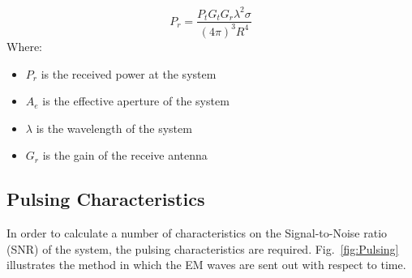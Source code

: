 \documentclass[11pt]{witseiepaper}
\begin{document}
\begin{bibunit}[witseie]
\begin{equation} \label{eqn:ReceivedPower}
    P_{r} = \frac{P_{t} G_{t} G_{r} \lambda^2 \sigma}{(4 \pi )^3 R^4}
\end{equation}
Where:
\begin{itemize}
    \item $P_{r}$ is the received power at the system
    \item $A_{e}$ is the effective aperture of the system
    \item $\lambda$ is the wavelength of the system
    \item $G_{r}$ is the gain of the receive antenna
\end{itemize}

\subsection{Pulsing Characteristics} \label{sec:PulsingCharacteristics}
In order to calculate a number of characteristics on the Signal-to-Noise ratio (SNR) of the system, the pulsing characteristics are required. Fig.~\ref{fig:Pulsing} illustrates the method in which the EM waves are sent out with respect to time. 


\end{bibunit}
\end{document}
